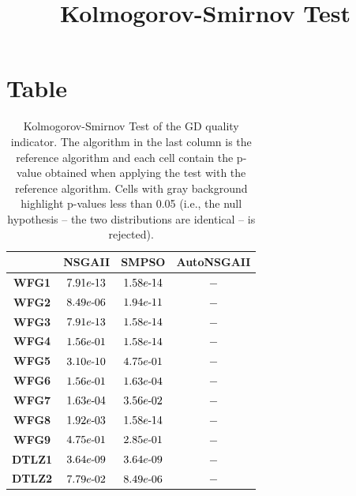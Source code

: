 \documentclass{article}
\title{Kolmogorov-Smirnov Test}
\author{}
\begin{document}
\maketitle
\section{Table}
\begin{table}[!htp]
  \caption{Kolmogorov-Smirnov Test of the GD quality indicator. The algorithm in the last column is the reference algorithm and each cell contain the p-value obtained when applying the test with the reference algorithm. Cells with gray background highlight p-values less than 0.05 (i.e., the null hypothesis -- the two distributions are identical -- is rejected).}
  \label{table:GD}
  \centering
  \begin{tiny}
  \begin{tabular}{c|ccc}
      & \textbf{NSGAII} & \textbf{SMPSO} & \textbf{AutoNSGAII} \\\hline
\textbf{WFG1} & $\cellcolor{gray25} 7.91e\makebox[0.1cm]{-}13 $ & $ \cellcolor{gray25} 1.58e\makebox[0.1cm]{-}14 $ & $ -$ \\
\textbf{WFG2} & $\cellcolor{gray25} 8.49e\makebox[0.1cm]{-}06 $ & $ \cellcolor{gray25} 1.94e\makebox[0.1cm]{-}11 $ & $ -$ \\
\textbf{WFG3} & $\cellcolor{gray25} 7.91e\makebox[0.1cm]{-}13 $ & $ \cellcolor{gray25} 1.58e\makebox[0.1cm]{-}14 $ & $ -$ \\
\textbf{WFG4} & $1.56e\makebox[0.1cm]{-}01 $ & $ \cellcolor{gray25} 1.58e\makebox[0.1cm]{-}14 $ & $ -$ \\
\textbf{WFG5} & $\cellcolor{gray25} 3.10e\makebox[0.1cm]{-}10 $ & $ 4.75e\makebox[0.1cm]{-}01 $ & $ -$ \\
\textbf{WFG6} & $1.56e\makebox[0.1cm]{-}01 $ & $ \cellcolor{gray25} 1.63e\makebox[0.1cm]{-}04 $ & $ -$ \\
\textbf{WFG7} & $\cellcolor{gray25} 1.63e\makebox[0.1cm]{-}04 $ & $ \cellcolor{gray25} 3.56e\makebox[0.1cm]{-}02 $ & $ -$ \\
\textbf{WFG8} & $\cellcolor{gray25} 1.92e\makebox[0.1cm]{-}03 $ & $ \cellcolor{gray25} 1.58e\makebox[0.1cm]{-}14 $ & $ -$ \\
\textbf{WFG9} & $4.75e\makebox[0.1cm]{-}01 $ & $ 2.85e\makebox[0.1cm]{-}01 $ & $ -$ \\
\textbf{DTLZ1} & $\cellcolor{gray25} 3.64e\makebox[0.1cm]{-}09 $ & $ \cellcolor{gray25} 3.64e\makebox[0.1cm]{-}09 $ & $ -$ \\
\textbf{DTLZ2} & $7.79e\makebox[0.1cm]{-}02 $ & $ \cellcolor{gray25} 8.49e\makebox[0.1cm]{-}06 $ & $ -$ \\

\end{tabular}
\end{tiny}
\end{table}
\end{document}
